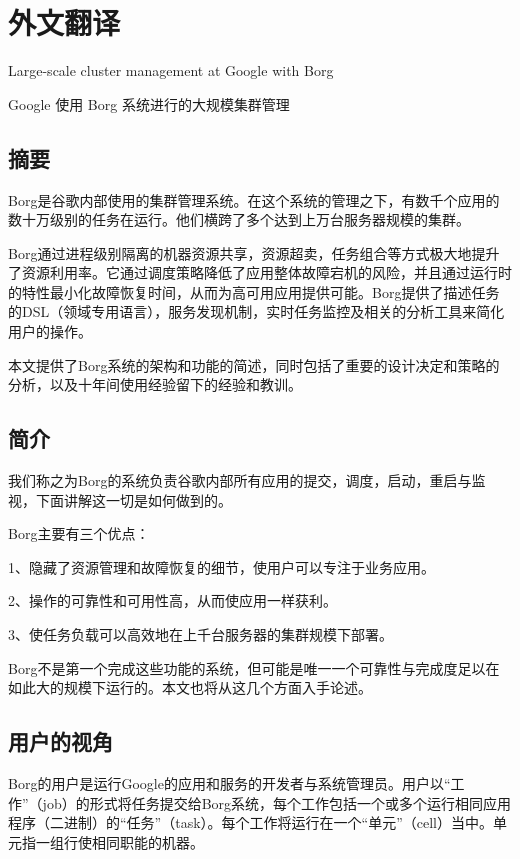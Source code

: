 \cleardoublepage
\chapter{外文翻译}

Large-scale cluster management at Google with Borg

Google 使用 Borg 系统进行的大规模集群管理

\section*{摘要}

Borg是谷歌内部使用的集群管理系统。在这个系统的管理之下，有数千个应用的数十万级别的任务在运行。他们横跨了多个达到上万台服务器规模的集群。

Borg通过进程级别隔离的机器资源共享，资源超卖，任务组合等方式极大地提升了资源利用率。它通过调度策略降低了应用整体故障宕机的风险，并且通过运行时的特性最小化故障恢复时间，从而为高可用应用提供可能。Borg提供了描述任务的DSL（领域专用语言），服务发现机制，实时任务监控及相关的分析工具来简化用户的操作。

本文提供了Borg系统的架构和功能的简述，同时包括了重要的设计决定和策略的分析，以及十年间使用经验留下的经验和教训。

\section{简介}

我们称之为Borg的系统负责谷歌内部所有应用的提交，调度，启动，重启与监视，下面讲解这一切是如何做到的。

Borg主要有三个优点：

1、隐藏了资源管理和故障恢复的细节，使用户可以专注于业务应用。

2、操作的可靠性和可用性高，从而使应用一样获利。

3、使任务负载可以高效地在上千台服务器的集群规模下部署。

Borg不是第一个完成这些功能的系统，但可能是唯一一个可靠性与完成度足以在如此大的规模下运行的。本文也将从这几个方面入手论述。

\section{用户的视角}

Borg的用户是运行Google的应用和服务的开发者与系统管理员。用户以“工作”（job）的形式将任务提交给Borg系统，每个工作包括一个或多个运行相同应用程序（二进制）的“任务”（task）。每个工作将运行在一个“单元”（cell）当中。单元指一组行使相同职能的机器。

